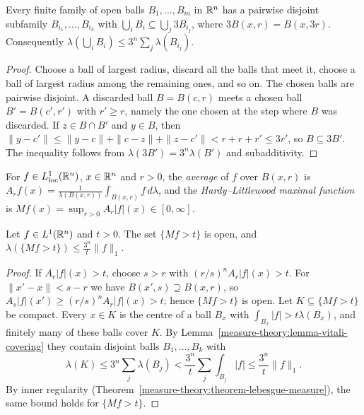 \begin{lemma}\label{measure-theory:lemma-vitali-covering}
Every finite family of open balls $B_1, \ldots, B_m$ in $\mathbb{R}^n$ has a pairwise disjoint subfamily $B_{i_1}, \ldots, B_{i_k}$ with
$\bigcup_iB_i \subseteq \bigcup_j3B_{i_j}$, where $3B(x, r) = B(x, 3r)$. Consequently $\lambda(\bigcup_iB_i) \leq 3^n\sum_j\lambda(B_{i_j})$.
\end{lemma}

\begin{proof}
Choose a ball of largest radius, discard all the balls that meet it, choose a ball of largest radius among the remaining ones, and so on. The chosen balls are
pairwise disjoint. A discarded ball $B = B(c, r)$ meets a chosen ball $B' = B(c', r')$ with $r' \geq r$, namely the one chosen at the step where $B$ was discarded.
If $z \in B \cap B'$ and $y \in B$, then $\|y - c'\| \leq \|y - c\| + \|c - z\| + \|z - c'\| < r + r + r' \leq 3r'$, so $B \subseteq 3B'$. The inequality follows from
$\lambda(3B') = 3^n\lambda(B')$ and subadditivity.
\end{proof}

\begin{definition}\label{measure-theory:definition-maximal-function}
For $f \in L^1_{\mathrm{loc}}(\mathbb{R}^n)$, $x \in \mathbb{R}^n$ and $r > 0$, the \emph{average} of $f$ over $B(x, r)$ is
$A_rf(x) = \frac{1}{\lambda(B(x, r))}\int_{B(x, r)}f\,d\lambda$, and the \emph{Hardy--Littlewood maximal function} is $Mf(x) = \sup_{r > 0}A_r|f|(x) \in [0, \infty]$.
\end{definition}

\begin{theorem}\label{measure-theory:theorem-maximal-inequality}
Let $f \in L^1(\mathbb{R}^n)$ and $t > 0$. The set $\{Mf > t\}$ is open, and $\lambda(\{Mf > t\}) \leq \frac{3^n}{t}\|f\|_1$.
\end{theorem}

\begin{proof}
If $A_r|f|(x) > t$, choose $s > r$ with $(r/s)^nA_r|f|(x) > t$. For $\|x' - x\| < s - r$ we have $B(x', s) \supseteq B(x, r)$, so
$A_s|f|(x') \geq (r/s)^nA_r|f|(x) > t$; hence $\{Mf > t\}$ is open. Let $K \subseteq \{Mf > t\}$ be compact. Every $x \in K$ is the centre of a ball $B_x$ with
$\int_{B_x}|f| > t\lambda(B_x)$, and finitely many of these balls cover $K$. By Lemma~\ref{measure-theory:lemma-vitali-covering} they contain disjoint balls
$B_1, \ldots, B_k$ with
\[
\lambda(K) \leq 3^n\sum_j\lambda(B_j) < \frac{3^n}{t}\sum_j\int_{B_j}|f| \leq \frac{3^n}{t}\|f\|_1.
\]
By inner regularity (Theorem~\ref{measure-theory:theorem-lebesgue-measure}), the same bound holds for $\{Mf > t\}$.
\end{proof}


